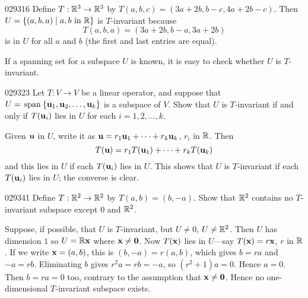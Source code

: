 \begin{example}{}{029316}
Define $T : \mathbb{R}^3 \to \mathbb{R}^3$ by $T(a, b, c) = (3a + 2b, b - c, 4a + 2b - c)$. Then $U = \{(a, b, a) \mid a, b \mbox{ in } \mathbb{R}\}$ is $T$-invariant because
\begin{equation*}
T(a, b, a) = (3a + 2b, b - a, 3a + 2b)
\end{equation*}
is in $U$ for all $a$ and $b$ (the first and last entries are equal).
\end{example}

If a spanning set for a subspace $U$ is known, it is easy to check whether $U$ is $T$-invariant.


\begin{example}{}{029323}
Let $T : V \to V$ be a linear operator, and suppose that $U = \thinspace\operatorname{span\medspace}\{\textbf{u}_{1}, \textbf{u}_{2}, \dots, \textbf{u}_{k}\}$ is a subspace of $V$. Show that $U$ is $T$-invariant if and only if $T(\textbf{u}_{i})$ lies in $U$ for each $i = 1, 2, \dots, k$.


\begin{solution}
Given $\textbf{u}$ in $U$, write it as $\textbf{u} = r_{1}\textbf{u}_{1} + \cdots + r_{k}\textbf{u}_{k}$, $r_{i}$ in $\mathbb{R}$. Then
\begin{equation*}
T(\textbf{u}) = r_1T(\textbf{u}_1) + \cdots + r_kT(\textbf{u}_k)
\end{equation*}
and this lies in $U$ if each $T(\textbf{u}_{i})$ lies in $U$. This shows that $U$ is $T$-invariant if each $T(\textbf{u}_{i})$ lies in $U$; the converse is clear.
\end{solution}
\end{example}

\begin{example}{}{029341}
Define $T : \mathbb{R}^2 \to \mathbb{R}^2$ by $T(a, b) = (b, -a)$. Show that $\mathbb{R}^2$ contains no $T$-invariant subspace except $0$ and $\mathbb{R}^2$.


\begin{solution}
  Suppose, if possible, that $U$ is $T$-invariant, but $U \neq 0$, $U \neq \mathbb{R}^2$. Then $U$ has dimension $1$ so $U = \mathbb{R}\textbf{x}$ where $\textbf{x} \neq \textbf{0}$. Now $T(\textbf{x})$ lies in $U$---say $T(\textbf{x}) = r\textbf{x}$, $r$ in $\mathbb{R}$. If we write $\textbf{x} = (a, b)$, this is $(b, -a) = r(a, b)$, which gives $b = ra$ and $-a = rb$. Eliminating $b$ gives $r^{2}a = rb = -a$, so $(r^{2} + 1)a = 0$. Hence $a = 0$. Then $b = ra = 0$ too, contrary to the assumption that $\textbf{x} \neq \textbf{0}$. Hence no one-dimensional $T$-invariant subspace exists.
\end{solution}
\end{example}

